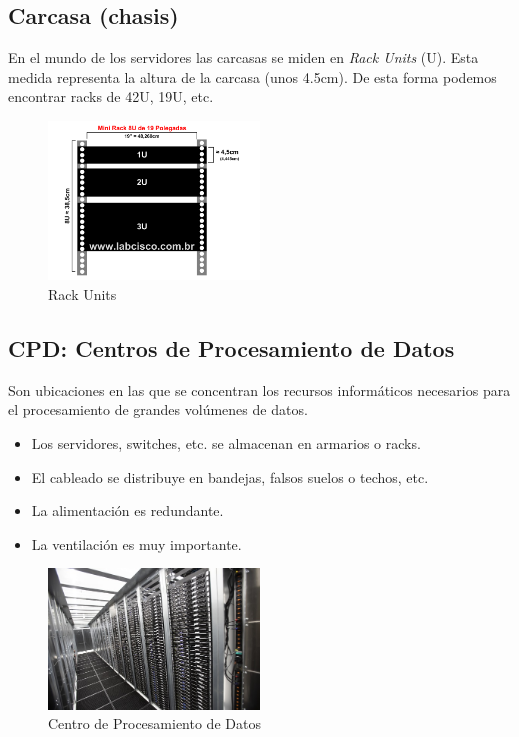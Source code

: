 \documentclass[12pt,spanish]{article}
\begin{document}
\subsection{Carcasa (chasis)}
En el mundo de los servidores las carcasas se miden en \emph{Rack Units} (U). Esta medida representa la altura de la carcasa (unos 4.5cm). De esta forma podemos encontrar racks de 42U, 19U, etc.
\begin{figure}[H]
	\centering
	\includegraphics[width=0.5\textwidth]{rackunits.png}
	\caption{Rack Units}
\end{figure}
\subsection{CPD: Centros de Procesamiento de Datos}
Son ubicaciones en las que se concentran los recursos informáticos necesarios para el procesamiento de grandes volúmenes de datos.
\begin{itemize}
	\item Los servidores, switches, etc. se almacenan en armarios o racks.
	\item El cableado se distribuye en bandejas, falsos suelos o techos, etc.
	\item La alimentación es redundante.
	\item La ventilación es muy importante.
\end{itemize}

\begin{figure}[H]
	\centering
	\includegraphics[width=0.5\textwidth]{cpd.jpg}
	\caption{Centro de Procesamiento de Datos}
\end{figure}
\end{document}
